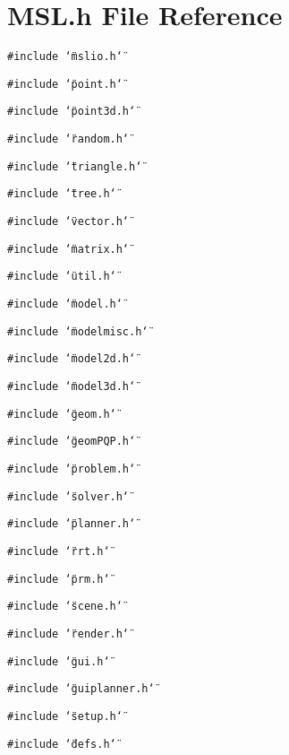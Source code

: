 \section{MSL.h File Reference}
\label{MSL_8h}
{\tt \#include \char`\"{}mslio.h\char`\"{}}\par
{\tt \#include \char`\"{}point.h\char`\"{}}\par
{\tt \#include \char`\"{}point3d.h\char`\"{}}\par
{\tt \#include \char`\"{}random.h\char`\"{}}\par
{\tt \#include \char`\"{}triangle.h\char`\"{}}\par
{\tt \#include \char`\"{}tree.h\char`\"{}}\par
{\tt \#include \char`\"{}vector.h\char`\"{}}\par
{\tt \#include \char`\"{}matrix.h\char`\"{}}\par
{\tt \#include \char`\"{}util.h\char`\"{}}\par
{\tt \#include \char`\"{}model.h\char`\"{}}\par
{\tt \#include \char`\"{}modelmisc.h\char`\"{}}\par
{\tt \#include \char`\"{}model2d.h\char`\"{}}\par
{\tt \#include \char`\"{}model3d.h\char`\"{}}\par
{\tt \#include \char`\"{}geom.h\char`\"{}}\par
{\tt \#include \char`\"{}geom\-PQP.h\char`\"{}}\par
{\tt \#include \char`\"{}problem.h\char`\"{}}\par
{\tt \#include \char`\"{}solver.h\char`\"{}}\par
{\tt \#include \char`\"{}planner.h\char`\"{}}\par
{\tt \#include \char`\"{}rrt.h\char`\"{}}\par
{\tt \#include \char`\"{}prm.h\char`\"{}}\par
{\tt \#include \char`\"{}scene.h\char`\"{}}\par
{\tt \#include \char`\"{}render.h\char`\"{}}\par
{\tt \#include \char`\"{}gui.h\char`\"{}}\par
{\tt \#include \char`\"{}guiplanner.h\char`\"{}}\par
{\tt \#include \char`\"{}setup.h\char`\"{}}\par
{\tt \#include \char`\"{}defs.h\char`\"{}}\par
